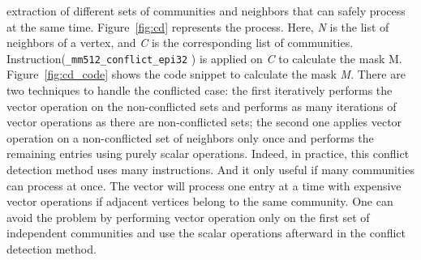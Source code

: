 \documentclass[default,iicol]{sn-jnl}%
\theoremstyle{thmstyleone}%
\theoremstyle{thmstyletwo}%
\theoremstyle{thmstylethree}%
\begin{document}
extraction of different sets of communities and neighbors that can safely process at the same time. Figure~\ref{fig:cd} represents the process. 
Here, \textit{N} is the list of neighbors of a vertex, and \textit{C} is the corresponding list of communities. 
Instruction(\texttt{\_mm512\_conflict\_epi32} ) is applied on \textit{C} to calculate the mask M. Figure~\ref{fig:cd_code} shows the code snippet 
to calculate the mask \textit{M}. 
There are two techniques to handle the conflicted case: the first iteratively performs the vector operation on the non-conflicted sets and performs 
as many iterations of vector operations as there are non-conflicted sets; the second one applies vector operation on a non-conflicted 
set of neighbors only once and performs the  remaining entries using purely scalar operations. Indeed, in practice, this conflict detection 
method uses many instructions. And it only useful if many communities can process at once. The vector will process one entry at 
a time with expensive vector operations if adjacent vertices belong to the same community. One can avoid the problem by performing 
vector operation only on the first set of independent communities and use the scalar operations afterward in the conflict detection method.
\end{document}
